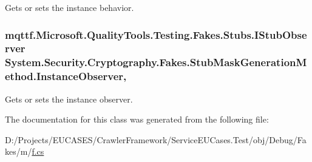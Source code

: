 Gets or sets the instance behavior.

\hypertarget{class_system_1_1_security_1_1_cryptography_1_1_fakes_1_1_stub_mask_generation_method_a10193351db6282394122569c4ed8c3de}{
\subsubsection[{Instance\-Observer}]{\setlength{\rightskip}{0pt plus 5cm}mqttf.\-Microsoft.\-Quality\-Tools.\-Testing.\-Fakes.\-Stubs.\-I\-Stub\-Observer System.\-Security.\-Cryptography.\-Fakes.\-Stub\-Mask\-Generation\-Method.\-Instance\-Observer\hspace{0.3cm}{\ttfamily [get]}, {\ttfamily [set]}}}\label{class_system_1_1_security_1_1_cryptography_1_1_fakes_1_1_stub_mask_generation_method_a10193351db6282394122569c4ed8c3de}


Gets or sets the instance observer.



The documentation for this class was generated from the following file\-:\begin{DoxyCompactItemize}
\item 
D\-:/\-Projects/\-E\-U\-C\-A\-S\-E\-S/\-Crawler\-Framework/\-Service\-E\-U\-Cases.\-Test/obj/\-Debug/\-Fakes/m/\hyperlink{m_2f_8cs}{f.\-cs}\end{DoxyCompactItemize}

